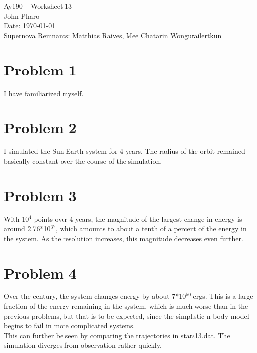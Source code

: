 \documentclass[11pt,letterpaper]{article}
\begin{document}
\begin{center}
\Large
Ay190 -- Worksheet 13\\
John Pharo\\
Date: \today\\
Supernova Remnants: Matthias Raives, Mee Chatarin Wongurailertkun
\end{center}

\section*{Problem 1}

I have familiarized myself.

\section*{Problem 2}

I simulated the Sun-Earth system for 4 years. The radius of the orbit remained basically constant over the course of the simulation.

\section*{Problem 3}

With 10$^4$ points over 4 years, the magnitude of the largest change in energy is around 2.76*10$^{37}$, which amounts to about a tenth of a percent of the energy in the system. As the resolution increases, this magnitude decreases even further.

\section*{Problem 4}

Over the century, the system changes energy by about 7*10$^{50}$ ergs. This is a large fraction of the energy remaining in the system, which is much worse than in the previous problems, but that is to be expected, since the simplistic n-body model begins to fail in more complicated systems. \\

This can further be seen by comparing the trajectories in stars13.dat. The simulation diverges from observation rather quickly.
\end{document}
